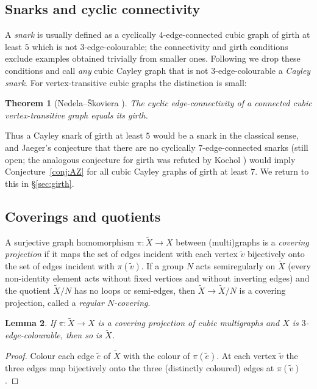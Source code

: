 \documentclass[11pt,a4paper]{article}
\newtheorem{theorem}{Theorem}[section]
\newtheorem{lemma}[theorem]{Lemma}
\theoremstyle{definition}
\theoremstyle{remark}
\begin{document}
\subsection{Snarks and cyclic connectivity}
A \emph{snark} is usually defined as a cyclically $4$-edge-connected cubic graph of girth at least $5$ which is not $3$-edge-colourable; the connectivity and girth conditions exclude examples obtained trivially from smaller ones.  Following \cite{NS01} we drop these conditions and call \emph{any} cubic Cayley graph that is not $3$-edge-colourable a \emph{Cayley snark}.  For vertex-transitive cubic graphs the distinction is small:

\begin{theorem}[Nedela--\v{S}koviera \cite{NS95}]\label{thm:cyclic}
The cyclic edge-connectivity of a connected cubic vertex-transitive graph equals its girth.
\end{theorem}

Thus a Cayley snark of girth at least $5$ would be a snark in the classical sense, and Jaeger's conjecture \cite{Jaeger85,JaegerSwart80} that there are no cyclically $7$-edge-connected snarks (still open; the analogous conjecture for girth was refuted by Kochol \cite{Kochol96}) would imply Conjecture~\ref{conj:AZ} for all cubic Cayley graphs of girth at least $7$.  We return to this in \S\ref{sec:girth}.

\subsection{Coverings and quotients}\label{sec:cover}
A surjective graph homomorphism $\pi\colon \tilde X\to X$ between (multi)graphs is a \emph{covering projection} if it maps the set of edges incident with each vertex $\tilde v$ bijectively onto the set of edges incident with $\pi(\tilde v)$.  If a group $N$ acts semiregularly on $\tilde X$ (every non-identity element acts without fixed vertices and without inverting edges) and the quotient $\tilde X/N$ has no loops or semi-edges, then $\tilde X\to\tilde X/N$ is a covering projection, called a \emph{regular $N$-covering}.

\begin{lemma}\label{lem:lift}
If $\pi\colon\tilde X\to X$ is a covering projection of cubic multigraphs and $X$ is $3$-edge-colourable, then so is $\tilde X$.
\end{lemma}
\begin{proof}
Colour each edge $\tilde e$ of $\tilde X$ with the colour of $\pi(\tilde e)$.  At each vertex $\tilde v$ the three edges map bijectively onto the three (distinctly coloured) edges at $\pi(\tilde v)$.
\end{proof}
\end{document}
